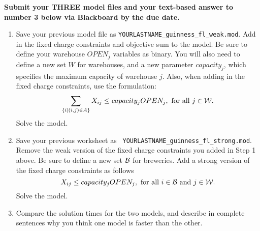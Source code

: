 \documentclass[10pt]{article}
\begin{document}
{\bf Submit your THREE model files and your text-based answer to number 3 below via Blackboard by the due date.}
\begin{enumerate}
\item  Save your previous model file as {\tt YOURLASTNAME\_guinness\_fl\_weak.mod}. Add in
  the fixed charge constraints and objective sum to the model.
  Be sure to define your warehouse $OPEN_j$ variables as
  binary. You will also need to define a new set $W$ for warehouses, and a new parameter $capacity_j$, which specifies the maximum capacity of warehouse $j$.  Also, when adding in the fixed charge constraints, use the
  formulation:
  \[
  \sum\limits_{\{i | (i,j) \in A\}} X_{ij} \leq capacity_j OPEN_j, \mbox{ for all $j \in {\cal W}$}.
  \]
Solve the model. 

\item Save your previous worksheet as {\tt
    YOURLASTNAME\_guinness\_fl\_strong.mod}. Remove the weak version of the fixed charge constraints you added in Step 1 above.  Be sure to define a new set ${\cal B}$ for breweries.  Add a strong version of the fixed charge
  constraints as follows
  \[
  X_{ij} \leq capacity_j OPEN_j, \mbox{ for all $i \in {\cal B}$ and $j \in {\cal W}$}.
  \]
  Solve the model.

\item Compare the solution times for the two models, and describe in complete sentences why you think one model is faster than the other.


\end{enumerate}
  
\end{document}
